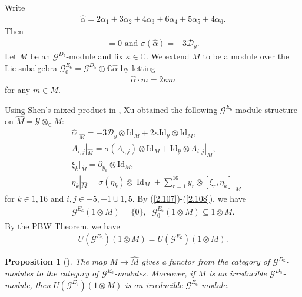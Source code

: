 \documentclass[12pt]{article}
\numberwithin{equation}{section}
\newtheorem{proposition}[theorem]{Proposition}
\theoremstyle{definition}
\theoremstyle{remark}
\begin{document}
Write
\begin{eqnarray}
	\widehat{\alpha}=2\alpha_1+3\alpha_2+4\alpha_3+6\alpha_4+5\alpha_5+4\alpha_6.\label{2.104}
\end{eqnarray}
Then
\begin{eqnarray}
	[\widehat{\alpha},\mathscr{G}^{D_5}]=0 \text{ and } \sigma(\widehat{\alpha})=-3\mathcal{D}_{y}.
\end{eqnarray}
Let $M$ be an $\mathscr{G}^{D_5}$-module and fix $\kappa\in\mathbb{C}$. We extend $M$ to be a module over the Lie subalgebra $\mathscr{G}^{E_6}_0=\mathscr{G}^{D_5}\oplus\mathbb{C}\widehat{\alpha}$ by letting
\begin{eqnarray}
	\widehat{\alpha}\cdot m=2\kappa m \label{2.68}
\end{eqnarray}
for any $m\in M$.

Using Shen's mixed product in \cite{Shen}, Xu obtained the following $\mathscr{G}^{E_6}$-module structure on $\widehat{M}=\mathscr{Y}\otimes_{\mathbb{C}}M$:
\begin{eqnarray}
	&\widehat{\alpha}|_{\widehat{M}}=-3\mathcal{D}_{y}\otimes \text{Id}_M+2\kappa\text{Id}_{\mathscr{Y}}\otimes\text{Id}_M,\label{2.107}\\
	&A_{i,j}|_{\widehat{M}}=\sigma(A_{i,j})\otimes\text{Id}_M+\text{Id}_{\mathscr{Y}}\otimes A_{i,j}|_M,\label{2.109} \\
	&\xi_k|_{\widehat{M}}=\partial_{y_k}\otimes \text{Id}_M,\label{2.108}\\
	&\eta_k|_{\widehat{M}}= \sigma(\eta_k)\otimes\operatorname{Id}_{M}+\sum\limits_{r=1}^{16}y_r\otimes [\xi_r,\eta_k]|_M \label{2.67}
\end{eqnarray}
for $k\in\overline{1,16}$ and $i,j\in\overline{-5,-1}\cup\overline{1,5}$.
By (\ref{2.107})-(\ref{2.108}), we have
\begin{eqnarray}
	\mathscr{G}^{E_6}_+(1\otimes M)=\{0\},\;\;\mathscr{G}^{E_6}_0(1\otimes M)\subseteq1\otimes M.
\end{eqnarray}
By the PBW Theorem, we have
\begin{eqnarray}
	U(\mathscr{G}^{E_6})(1\otimes M)=U(\mathscr{G}^{E_6}_-)(1\otimes M).
\end{eqnarray}
\begin{proposition}[]  The map $M\longrightarrow\widehat{M}$ gives a functor from the category of  $\mathscr{G}^{D_5}$-modules to the category of $\mathscr{G}^{E_6}$-modules. Moreover, if $M$ is an irreducible $\mathscr{G}^{D_5}$-module, then $U(\mathscr{G}^{E_6}_-)(1\otimes M)$ is an irreducible $\mathscr{G}^{E_6}$-module.
\end{proposition}
\end{document}
